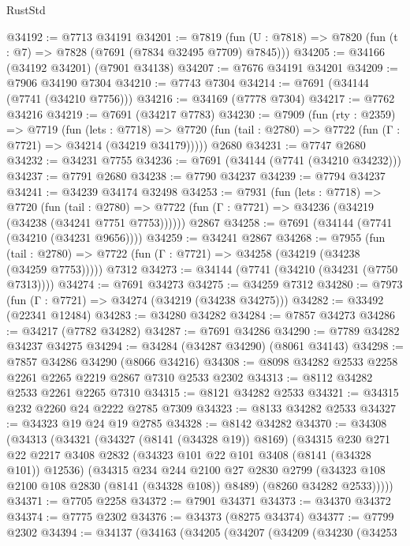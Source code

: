 \begin{lexlean}{RustStd}
\begin{coremodule}
@34192 := @7713 @34191
@34201 := @7819
    (fun (U : @7818) => @7820 (fun (t : @7) => @7828 (@7691 (@7834 @32495 @7709) @7845)))
@34205 := @34166 (@34192 @34201) (@7901 @34138)
@34207 := @7676 @34191 @34201
@34209 := @7906 @34190 @7304
@34210 := @7743 @7304
@34214 := @7691 (@34144 (@7741 (@34210 @7756)))
@34216 := @34169 (@7778 @7304)
@34217 := @7762 @34216
@34219 := @7691 (@34217 @7783)
@34230 := @7909
    (fun (rty : @2359) =>
    @7719
      (fun (lets : @7718) =>
      @7720 (fun (tail : @2780) => @7722 (fun (Γ : @7721) => @34214 (@34219 @34179)))))
    @2680
@34231 := @7747 @2680
@34232 := @34231 @7755
@34236 := @7691 (@34144 (@7741 (@34210 @34232)))
@34237 := @7791 @2680
@34238 := @7790 @34237
@34239 := @7794 @34237
@34241 := @34239 @34174 @32498
@34253 := @7931
    (fun (lets : @7718) =>
    @7720
      (fun (tail : @2780) =>
      @7722 (fun (Γ : @7721) => @34236 (@34219 (@34238 (@34241 @7751 @7753))))))
    @2867
@34258 := @7691 (@34144 (@7741 (@34210 (@34231 @9656))))
@34259 := @34241 @2867
@34268 := @7955
    (fun (tail : @2780) => @7722 (fun (Γ : @7721) => @34258 (@34219 (@34238 (@34259 @7753)))))
    @7312
@34273 := @34144 (@7741 (@34210 (@34231 (@7750 @7313))))
@34274 := @7691 @34273
@34275 := @34259 @7312
@34280 := @7973 (fun (Γ : @7721) => @34274 (@34219 (@34238 @34275)))
@34282 := @33492 (@22341 @12484)
@34283 := @34280 @34282
@34284 := @7857 @34273
@34286 := @34217 (@7782 @34282)
@34287 := @7691 @34286
@34290 := @7789 @34282 @34237 @34275
@34294 := @34284 (@34287 @34290) (@8061 @34143)
@34298 := @7857 @34286 @34290 (@8066 @34216)
@34308 := @8098 @34282 @2533 @2258 @2261 @2265 @2219 @2867 @7310 @2533 @2302
@34313 := @8112 @34282 @2533 @2261 @2265 @7310
@34315 := @8121 @34282 @2533
@34321 := @34315 @232 @2260 @24 @2222 @2785 @7309
@34323 := @8133 @34282 @2533
@34327 := @34323 @19 @24 @19 @2785
@34328 := @8142 @34282
@34370 := @34308
    (@34313
      (@34321
        (@34327 (@8141 (@34328 @19)) @8169)
        (@34315
          @230
          @271
          @22
          @2217
          @3408
          @2832
          (@34323 @101 @22 @101 @3408 (@8141 (@34328 @101)) @12536)
          (@34315
            @234
            @244
            @2100
            @27
            @2830
            @2799
            (@34323 @108 @2100 @108 @2830 (@8141 (@34328 @108)) @8489)
            (@8260 @34282 @2533)))))
@34371 := @7705 @2258
@34372 := @7901 @34371
@34373 := @34370 @34372
@34374 := @7775 @2302
@34376 := @34373 (@8275 @34374)
@34377 := @7799 @2302
@34394 := @34137
    (@34163
      (@34205
        (@34207
          (@34209
            (@34230
              (@34253

\end{coremodule}
\end{lexlean}
